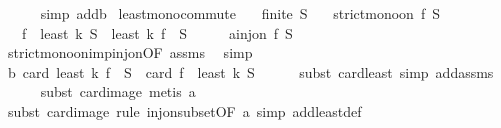 \begin{isabellebody}
\ \ \ \ \isamarkupfalse%
\ {\isacharparenleft}{\kern0pt}simp\ add{\isacharcolon}{\kern0pt}b{\isacharparenright}{\kern0pt}\isanewline
{}\isamarkupfalse%
%
\endisatagproof
{\isafoldproof}%
%
\isadelimproof
\isanewline
%
\endisadelimproof
\isanewline
{}\isamarkupfalse%
\ least{\isacharunderscore}{\kern0pt}mono{\isacharunderscore}{\kern0pt}commute{\isacharcolon}{\kern0pt}\isanewline
\ \ \ {\isachardoublequoteopen}finite\ S{\isachardoublequoteclose}\isanewline
\ \ \ {\isachardoublequoteopen}strict{\isacharunderscore}{\kern0pt}mono{\isacharunderscore}{\kern0pt}on\ f\ S{\isachardoublequoteclose}\isanewline
\ \ \ {\isachardoublequoteopen}f\ {\isacharbackquote}{\kern0pt}\ least\ k\ S\ {\isacharequal}{\kern0pt}\ least\ k\ {\isacharparenleft}{\kern0pt}f\ {\isacharbackquote}{\kern0pt}\ S{\isacharparenright}{\kern0pt}{\isachardoublequoteclose}\isanewline
%
\isadelimproof
%
\endisadelimproof
%
\isatagproof
{}\isamarkupfalse%
\ {\isacharminus}{\kern0pt}\isanewline
\ \ \isamarkupfalse%
\ a{\isacharcolon}{\kern0pt}{\isachardoublequoteopen}inj{\isacharunderscore}{\kern0pt}on\ f\ S{\isachardoublequoteclose}\ \isanewline
\ \ \ \ \isamarkupfalse%
\ strict{\isacharunderscore}{\kern0pt}mono{\isacharunderscore}{\kern0pt}on{\isacharunderscore}{\kern0pt}imp{\isacharunderscore}{\kern0pt}inj{\isacharunderscore}{\kern0pt}on{\isacharbrackleft}{\kern0pt}OF\ assms{\isacharparenleft}{\kern0pt}{}{\isacharparenright}{\kern0pt}{\isacharbrackright}{\kern0pt}\ \isamarkupfalse%
\ simp\isanewline
\ \ \isamarkupfalse%
\ b{\isacharcolon}{\kern0pt}\ {\isachardoublequoteopen}card\ {\isacharparenleft}{\kern0pt}least\ k\ {\isacharparenleft}{\kern0pt}f\ {\isacharbackquote}{\kern0pt}\ S{\isacharparenright}{\kern0pt}{\isacharparenright}{\kern0pt}\ {\isasymle}\ card\ {\isacharparenleft}{\kern0pt}f\ {\isacharbackquote}{\kern0pt}\ least\ k\ S{\isacharparenright}{\kern0pt}{\isachardoublequoteclose}\isanewline
\ \ \ \ \isamarkupfalse%
\ {\isacharparenleft}{\kern0pt}subst\ card{\isacharunderscore}{\kern0pt}least{\isacharcomma}{\kern0pt}\ simp\ add{\isacharcolon}{\kern0pt}assms{\isacharparenright}{\kern0pt}\isanewline
\ \ \ \ \isamarkupfalse%
\ {\isacharparenleft}{\kern0pt}subst\ card{\isacharunderscore}{\kern0pt}image{\isacharcomma}{\kern0pt}\ metis\ a{\isacharparenright}{\kern0pt}\isanewline
\ \ \ \ \isamarkupfalse%
\ {\isacharparenleft}{\kern0pt}subst\ card{\isacharunderscore}{\kern0pt}image{\isacharcomma}{\kern0pt}\ rule\ inj{\isacharunderscore}{\kern0pt}on{\isacharunderscore}{\kern0pt}subset{\isacharbrackleft}{\kern0pt}OF\ a{\isacharbrackright}{\kern0pt}{\isacharcomma}{\kern0pt}\ simp\ add{\isacharcolon}{\kern0pt}least{\isacharunderscore}{\kern0pt}def{\isacharparenright}{\kern0pt}\isanewline

\end{isabellebody}
